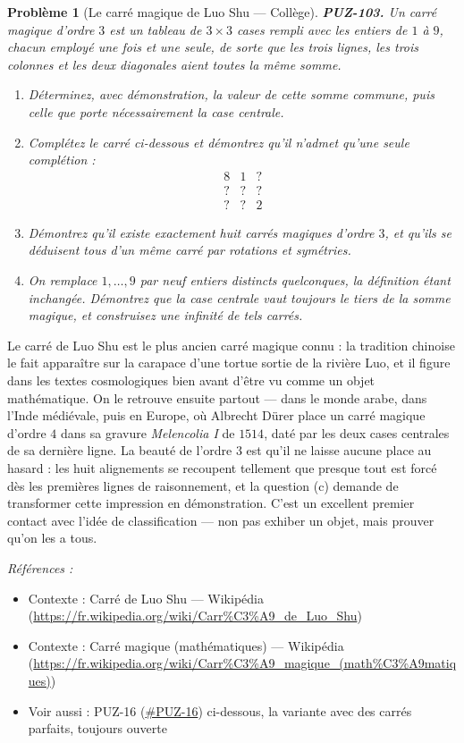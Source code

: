 \documentclass[11pt]{article}
\newtheorem{problem}{Problème}
\newenvironment{refs}{\par\small\noindent\emph{Références :}\begin{itemize}\setlength\itemsep{0pt}}{\end{itemize}\normalsize}
\begin{document}
\begin{problem}[{Le carré magique de Luo Shu --- Collège}]
\textbf{PUZ-103.} Un carré magique d'ordre $ 3 $ est un tableau de $ 3 \times 3 $ cases
rempli avec les entiers de $ 1 $ à $ 9 $, chacun employé une fois et une seule, de sorte
que les trois lignes, les trois colonnes et les deux diagonales aient toutes la même
somme.
\begin{enumerate}
\item[(a)] Déterminez, avec démonstration, la valeur de cette somme commune, puis celle que porte
nécessairement la case centrale.
\item[(b)] Complétez le carré ci-dessous et démontrez qu'il n'admet qu'une seule complétion :
\[ \begin{array}{ccc} 8 & 1 & ? \\ ? & ? & ? \\ ? & ? & 2 \end{array} \]
\item[(c)] Démontrez qu'il existe exactement huit carrés magiques d'ordre $ 3 $, et qu'ils se
déduisent tous d'un même carré par rotations et symétries.
\item[(d)] On remplace $ 1, \dots, 9 $ par neuf entiers distincts quelconques, la définition étant
inchangée. Démontrez que la case centrale vaut toujours le tiers de la somme magique, et
construisez une infinité de tels carrés.
\end{enumerate}

\end{problem}

\noindent Le carré de Luo Shu est le plus ancien carré magique connu : la tradition
chinoise le fait apparaître sur la carapace d'une tortue sortie de la rivière Luo, et il
figure dans les textes cosmologiques bien avant d'être vu comme un objet mathématique. On le
retrouve ensuite partout --- dans le monde arabe, dans l'Inde médiévale, puis en Europe, où
Albrecht Dürer place un carré magique d'ordre $ 4 $ dans sa gravure \textit{Melencolia I} de
$ 1514 $, daté par les deux cases centrales de sa dernière ligne. La beauté de l'ordre
$ 3 $ est qu'il ne laisse aucune place au hasard : les huit alignements se recoupent
tellement que presque tout est forcé dès les premières lignes de raisonnement, et la question
(c) demande de transformer cette impression en démonstration. C'est un excellent premier
contact avec l'idée de classification --- non pas exhiber un objet, mais prouver qu'on les a
tous.

\begin{refs}
\item Contexte : Carré de Luo Shu --- Wikipédia (\url{https://fr.wikipedia.org/wiki/Carr%C3%A9_de_Luo_Shu})
\item Contexte : Carré magique (mathématiques) --- Wikipédia (\url{https://fr.wikipedia.org/wiki/Carr%C3%A9_magique_(math%C3%A9matiques)})
\item Voir aussi : PUZ-16 (\url{#PUZ-16}) ci-dessous, la variante avec des carrés parfaits, toujours ouverte
\end{refs}
\end{document}
